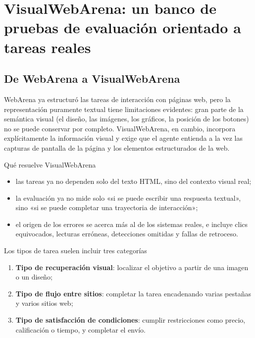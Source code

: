 \documentclass[a4paper]{article}
\begin{document}
\section{VisualWebArena: un banco de pruebas de evaluación orientado a tareas reales}

\subsection{De WebArena a VisualWebArena}
WebArena ya estructuró las tareas de interacción con páginas web, pero la representación puramente textual tiene limitaciones evidentes: gran parte de la semántica visual (el diseño, las imágenes, los gráficos, la posición de los botones) no se puede conservar por completo. VisualWebArena, en cambio, incorpora explícitamente la información visual y exige que el agente entienda a la vez las capturas de pantalla de la página y los elementos estructurados de la web.

\begin{importantbox}{Qué resuelve VisualWebArena}
\begin{itemize}
    \item las tareas ya no dependen solo del texto HTML, sino del contexto visual real;
    \item la evaluación ya no mide solo «si se puede escribir una respuesta textual», sino «si se puede completar una trayectoria de interacción»;
    \item el origen de los errores se acerca más al de los sistemas reales, e incluye clics equivocados, lecturas erróneas, detecciones omitidas y fallas de retroceso.
\end{itemize}
\end{importantbox}

\begin{knowledgebox}{Los tipos de tarea suelen incluir tres categorías}
\begin{enumerate}
    \item \textbf{Tipo de recuperación visual}: localizar el objetivo a partir de una imagen o un diseño;
    \item \textbf{Tipo de flujo entre sitios}: completar la tarea encadenando varias pestañas y varios sitios web;
    \item \textbf{Tipo de satisfacción de condiciones}: cumplir restricciones como precio, calificación o tiempo, y completar el envío.
\end{enumerate}
\end{knowledgebox}
\end{document}
